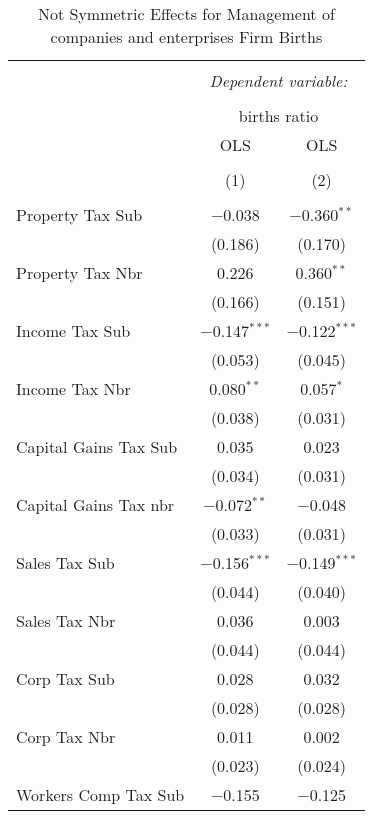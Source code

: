 
\begin{table}[!htbp] \centering 
  \caption{Not Symmetric Effects for  Management of companies and enterprises Firm Births} 
  \label{55noequality} 
\footnotesize 
\begin{tabular}{@{\extracolsep{5pt}}lcc} 
\\[-1.8ex]\hline 
\hline \\[-1.8ex] 
 & \multicolumn{2}{c}{\textit{Dependent variable:}} \\ 
\cline{2-3} 
\\[-1.8ex] & \multicolumn{2}{c}{births ratio} \\ 
 & OLS & OLS \\ 
\\[-1.8ex] & (1) & (2)\\ 
\hline \\[-1.8ex] 
 Property Tax Sub & $-$0.038 & $-$0.360$^{**}$ \\ 
  & (0.186) & (0.170) \\ 
  Property Tax Nbr & 0.226 & 0.360$^{**}$ \\ 
  & (0.166) & (0.151) \\ 
  Income Tax Sub & $-$0.147$^{***}$ & $-$0.122$^{***}$ \\ 
  & (0.053) & (0.045) \\ 
  Income Tax Nbr & 0.080$^{**}$ & 0.057$^{*}$ \\ 
  & (0.038) & (0.031) \\ 
  Capital Gains Tax Sub & 0.035 & 0.023 \\ 
  & (0.034) & (0.031) \\ 
  Capital Gains Tax nbr & $-$0.072$^{**}$ & $-$0.048 \\ 
  & (0.033) & (0.031) \\ 
  Sales Tax Sub & $-$0.156$^{***}$ & $-$0.149$^{***}$ \\ 
  & (0.044) & (0.040) \\ 
  Sales Tax Nbr & 0.036 & 0.003 \\ 
  & (0.044) & (0.044) \\ 
  Corp Tax Sub & 0.028 & 0.032 \\ 
  & (0.028) & (0.028) \\ 
  Corp Tax Nbr & 0.011 & 0.002 \\ 
  & (0.023) & (0.024) \\ 
  Workers Comp Tax Sub & $-$0.155 & $-$0.125 \\ 

\end{tabular}
\end{table}

